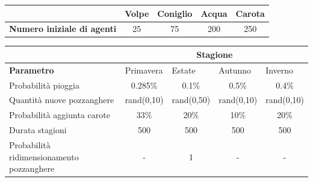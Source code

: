 \documentclass[11pt]{article}
\begin{document}
\begin{table}[h!]
\centering
{\renewcommand\arraystretch{1.9}
\begin{tabular}{l|cccc}
& \textbf{Volpe} & \textbf{Coniglio} & \textbf{Acqua} & \textbf{Carota} \\ \hline
\textbf{Numero iniziale di agenti} & 25    & 75       & 200   & 250   
\end{tabular}}
\end{table}

\begin{table}[h!]
\centering
{\renewcommand\arraystretch{1.6}
\begin{tabular}{p{}|cccc}
& \multicolumn{4}{c}{\textbf{Stagione}} \\   
\hline
\textbf{Parametro} & \multicolumn{1}{l}{Primavera} & \multicolumn {1}{l}{Estate} & \multicolumn{1}{l}{Autunno} & \multicolumn{1}{l}{Inverno} \\
\hline
Probabilità pioggia  & 0.285\%  & 0.1\%  & 0.5\% & 0.4\% \\
Quantità nuove pozzanghere & rand(0,10) & rand(0,50) & rand(0,10) & rand(0,10) \\
Probabilità aggiunta carote & 33\% & 20\% & 10\% & 20\% \\
Durata stagioni & 500 & 500 & 500 & 500 \\
Probabilità ridimensionamento pozzanghere & -  & 1  & - & -    
\end{tabular}}
\end{table}


\end{document}
